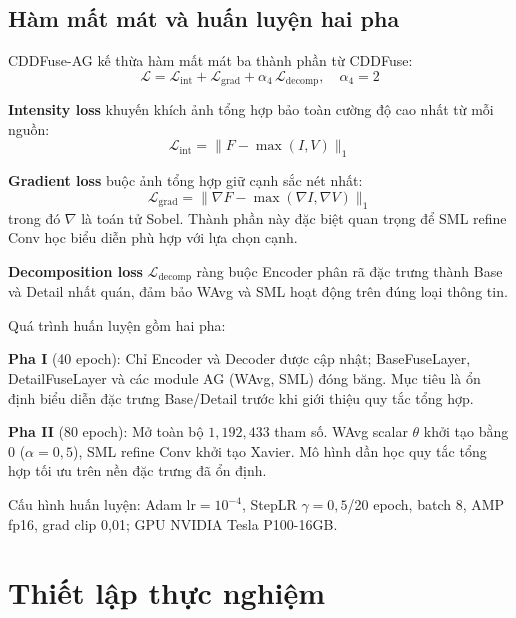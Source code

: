 \documentclass[12pt,a4paper]{article}
\begin{document}
\subsection{Hàm mất mát và huấn luyện hai pha}

CDDFuse-AG kế thừa hàm mất mát ba thành phần từ CDDFuse:
\begin{equation}
  \mathcal{L} = \mathcal{L}_{\mathrm{int}} + \mathcal{L}_{\mathrm{grad}}
              + \alpha_4\,\mathcal{L}_{\mathrm{decomp}}, \quad \alpha_4 = 2
  \label{eq:loss}
\end{equation}

\textbf{Intensity loss} khuyến khích ảnh tổng hợp bảo toàn cường độ cao nhất từ
mỗi nguồn:
\begin{equation}
  \mathcal{L}_{\mathrm{int}} = \|F - \max(I, V)\|_1
\end{equation}

\textbf{Gradient loss} buộc ảnh tổng hợp giữ cạnh sắc nét nhất:
\begin{equation}
  \mathcal{L}_{\mathrm{grad}} = \|\nabla F - \max(\nabla I, \nabla V)\|_1
\end{equation}
trong đó $\nabla$ là toán tử Sobel. Thành phần này đặc biệt quan trọng để SML
refine Conv học biểu diễn phù hợp với lựa chọn cạnh.

\textbf{Decomposition loss} $\mathcal{L}_{\mathrm{decomp}}$ ràng buộc Encoder
phân rã đặc trưng thành Base và Detail nhất quán, đảm bảo WAvg và SML hoạt động
trên đúng loại thông tin.

Quá trình huấn luyện gồm hai pha:

\textbf{Pha I} (40 epoch): Chỉ Encoder và Decoder được cập nhật; BaseFuseLayer,
DetailFuseLayer và các module AG (WAvg, SML) đóng băng. Mục tiêu là ổn định biểu
diễn đặc trưng Base/Detail trước khi giới thiệu quy tắc tổng hợp.

\textbf{Pha II} (80 epoch): Mở toàn bộ $1{,}192{,}433$ tham số. WAvg scalar
$\theta$ khởi tạo bằng 0 ($\alpha=0{,}5$), SML refine Conv khởi tạo Xavier.
Mô hình dần học quy tắc tổng hợp tối ưu trên nền đặc trưng đã ổn định.

Cấu hình huấn luyện: Adam lr$=10^{-4}$, StepLR $\gamma=0{,}5$/20 epoch,
batch 8, AMP fp16, grad clip 0,01; GPU NVIDIA Tesla P100-16GB.

\section{Thiết lập thực nghiệm}
\label{sec:exp}
\end{document}
